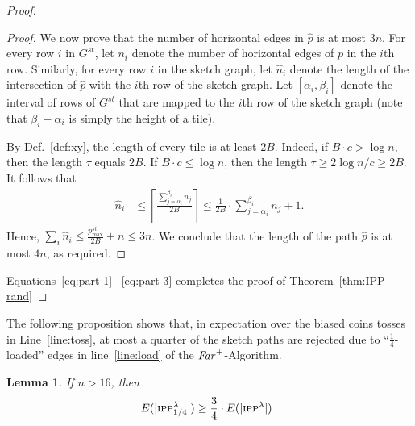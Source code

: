 \documentclass[11pt]{article}
\newtheorem{lemma}[theorem]{Lemma}
\newcommand{\pmax}{p_{\max}}
\newenvironment{proof sketch}[1]{\noindent {\emph{Proof sketch of #1:}}}{\hfill \qed}
\newcommand{\far}{\text{\emph{Far}}}
\newcommand{\Rinj}{\RIPPt_{1/4}}
\newcommand{\hl}{\tau}
\begin{document}
\begin{proof}
\begin{proof}
  We now prove that the number of horizontal edges in $\hat p$ is at most $3n$. For
  every row $i$ in $G^{st}$, let $n_i$ denote the number of horizontal edges of $p$
  in the $i$th row.
  Similarly, for every row $i$ in the sketch graph, let $\hat{n}_i$
  denote the length of the intersection of $\hat p$ with the $i$th row of the sketch graph.  Let $[\alpha_{i}, \beta_{i}]$ denote the interval of rows of
  $G^{st}$ that are mapped to the $i$th row of the sketch graph (note that
  $\beta_i-\alpha_i$ is simply the height of a tile).

  By Def.~\ref{def:xy}, the length of every tile is at least $2B$. Indeed, if $B\cdot
  c> \log n$, then the length $\hl$ equals $2B$.  If $B\cdot c \leq \log n$, then the length
  $\hl \geq 2\log n/c \geq 2B$.  It follows that
  \begin{align*}
    \hat n_i &\leq \left\lceil{\frac{\sum_{j= \alpha_{ i}}^{\beta_{i}}
          n_j}{2B}}\right\rceil \leq \frac{1}{2B} \cdot \sum_{j= \alpha_{
        i}}^{\beta_{i}} n_j +1.
  \end{align*}
  Hence, $\sum_{i} \hat n_{i} \leq \frac{\pmax^{st}}{2B} + n \leq
  3n$. We conclude that the length of the path $\hat p$ is at most $4n$, as required.
\end{proof}
Equations~\eqref{eq:part 1}-~\eqref{eq:part 3} completes the proof of Theorem~\ref{thm:IPP rand}
\end{proof}


The following proposition shows that, in expectation  over the biased coins
tosses in Line~\ref{line:toss}, at most a quarter of the sketch paths are
rejected due to ``$\frac 14$-loaded''  edges in line~\ref{line:load} of the
$\far^+$-Algorithm.
\begin{lemma}\label{lemma:Rinj}
If $n > 16$, then
$$E(|\Rinj|) \geq \frac 34 \cdot E(|\RIPPt|)\:.$$
\end{lemma}
\end{document}
